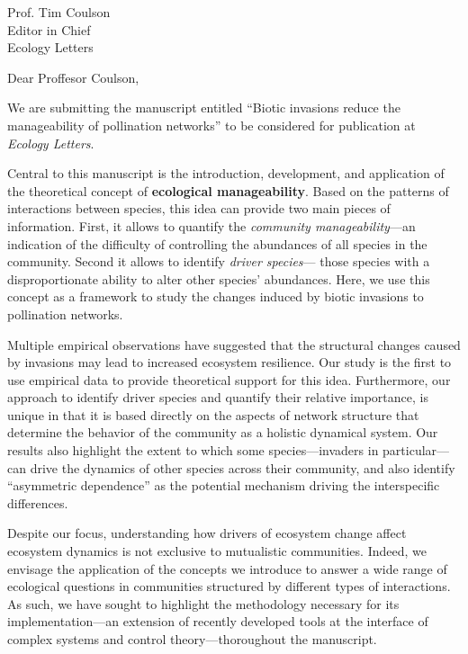 \documentclass[10pt, a4paper]{letter}
\begin{document}
\begin{letter}{
       Prof. Tim Coulson\\
       Editor in Chief\\
       Ecology Letters}

\opening{Dear Proffesor Coulson,}

We are submitting the manuscript entitled ``Biotic invasions reduce the manageability of pollination networks'' to be considered for publication at \emph{Ecology Letters}. 

Central to this manuscript is the introduction, development, and application of the theoretical concept of \textbf{ecological manageability}.
Based on the patterns of interactions between species, this idea can provide two main pieces of information. 
First, it allows to quantify the \textit{community manageability}---an indication of the difficulty of controlling the abundances of all species in the community. 
Second it allows to identify \textit{driver species}--- those species with a disproportionate ability to alter other species' abundances.  
Here, we use this concept as a framework to study the changes induced by biotic invasions to pollination networks. 

Multiple empirical observations have suggested that the structural changes caused by invasions may lead to increased ecosystem resilience. 
Our study is the first to use empirical data to provide theoretical support for this idea. 
Furthermore, our approach to identify driver species and quantify their relative importance, is unique in that it is based directly on the aspects of network structure that determine the behavior of the community as a holistic dynamical system. 
Our results also highlight the extent to which some species---invaders in particular---can drive the dynamics of other species across their community, and also identify ``asymmetric dependence'' as the potential mechanism driving the interspecific differences.

Despite our focus, understanding how drivers of ecosystem change affect ecosystem dynamics is not exclusive to mutualistic communities. 
Indeed, we envisage the application of the concepts we introduce to answer a wide range of ecological questions in communities structured by different types of interactions.
As such, we have sought to highlight the methodology necessary for its implementation---an extension of recently developed tools at the interface of complex systems and control theory---thoroughout the manuscript. 


\end{letter}
\end{document}
